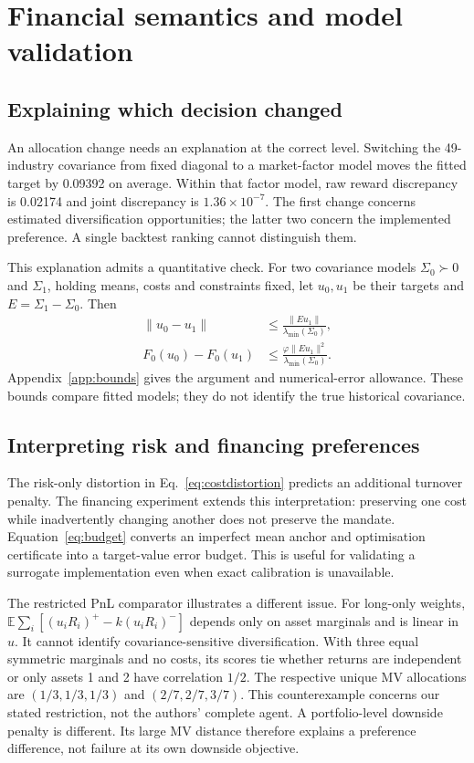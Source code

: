 \documentclass[sigconf,anonymous,review]{acmart}
\newcommand{\E}{\mathbb{E}}
\begin{document}
\section{Financial semantics and model validation}
\subsection{Explaining which decision changed}
An allocation change needs an explanation at the correct level. Switching the 49-industry covariance from fixed diagonal to a market-factor model moves the fitted target by 0.09392 on average. Within that factor model, raw reward discrepancy is 0.02174 and joint discrepancy is $1.36\times10^{-7}$. The first change concerns estimated diversification opportunities; the latter two concern the implemented preference. A single backtest ranking cannot distinguish them.

This explanation admits a quantitative check. For two covariance models $\Sigma_0\succ0$ and $\Sigma_1$, holding means, costs and constraints fixed, let $u_0,u_1$ be their targets and $E=\Sigma_1-\Sigma_0$. Then
\begin{align}\label{eq:covbound}
\|u_0-u_1\|&\le\frac{\|Eu_1\|}{\lambda_{\min}(\Sigma_0)},\\
F_0(u_0)-F_0(u_1)&\le\frac{\varphi\|Eu_1\|^2}{\lambda_{\min}(\Sigma_0)}.\nonumber
\end{align}
Appendix~\ref{app:bounds} gives the argument and numerical-error allowance. These bounds compare fitted models; they do not identify the true historical covariance.

\subsection{Interpreting risk and financing preferences}
The risk-only distortion in Eq.\ \eqref{eq:costdistortion} predicts an additional turnover penalty. The financing experiment extends this interpretation: preserving one cost while inadvertently changing another does not preserve the mandate. Equation~\eqref{eq:budget} converts an imperfect mean anchor and optimisation certificate into a target-value error budget. This is useful for validating a surrogate implementation even when exact calibration is unavailable.

The restricted PnL comparator illustrates a different issue. For long-only weights, $\E\sum_i[(u_iR_i)^+-k(u_iR_i)^-]$ depends only on asset marginals and is linear in $u$. It cannot identify covariance-sensitive diversification. With three equal symmetric marginals and no costs, its scores tie whether returns are independent or only assets 1 and 2 have correlation $1/2$. The respective unique MV allocations are $(1/3,1/3,1/3)$ and $(2/7,2/7,3/7)$. This counterexample concerns our stated restriction, not the authors' complete agent. A portfolio-level downside penalty is different. Its large MV distance therefore explains a preference difference, not failure at its own downside objective.
\end{document}
